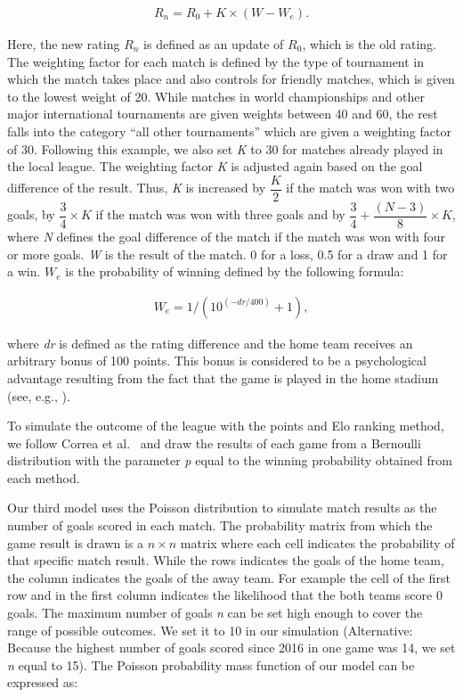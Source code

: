 \documentclass[12pt,a4paper]{article}
\begin{document}
\begin{align}
R_n = R_0 + K \times (W - W_e).
\end{align}

Here, the new rating \(R_n\) is defined as an update of \(R_0\), which
is the old rating. The weighting factor for each match is defined by the
type of tournament in which the match takes place and also controls for
friendly matches, which is given to the lowest weight of 20. While
matches in world championships and other major international tournaments
are given weights between 40 and 60, the rest falls into the category
\enquote{all other tournaments} which are given a weighting factor of
30. Following this example, we also set \emph{K} to 30 for matches
already played in the local league. The weighting factor \emph{K} is
adjusted again based on the goal difference of the result. Thus,
\emph{K} is increased by \(\dfrac{K}{2}\) if the match was won with two
goals, by \(\dfrac{3}{4}\times K\) if the match was won with three goals
and by \(\dfrac{3}{4} + \dfrac{(N-3)}{8} \times K\), where \emph{N}
defines the goal difference of the match if the match was won with four
or more goals. \emph{W} is the result of the match. 0 for a loss, 0.5
for a draw and 1 for a win. \(W_e\) is the probability of winning
defined by the following formula:

\begin{align}
W_e = 1/(10^{(-dr/400)}+1),
\end{align}

where \emph{dr} is defined as the rating difference and the home team
receives an arbitrary bonus of 100 points. This bonus is considered to
be a psychological advantage resulting from the fact that the game is
played in the home stadium (see, e.g., \textcite{Pollard2008}).

To simulate the outcome of the league with the points and Elo ranking
method, we follow Correa et al.~\autocite*{correa} and draw the results
of each game from a Bernoulli distribution with the parameter \emph{p}
equal to the winning probability obtained from each method.

Our third model uses the Poisson distribution to simulate match results
as the number of goals scored in each match. The probability matrix from
which the game result is drawn is a \(n \times n\) matrix where each
cell indicates the probability of that specific match result. While the
rows indicates the goals of the home team, the column indicates the
goals of the away team. For example the cell of the first row and in the
first column indicates the likelihood that the both teams score \(0\)
goals. The maximum number of goals \emph{n} can be set high enough to
cover the range of possible outcomes. We set it to 10 in our simulation
(Alternative: Because the highest number of goals scored since 2016 in
one game was 14, we set \emph{n} equal to 15). The Poisson probability
mass function of our model can be expressed as:
\end{document}
